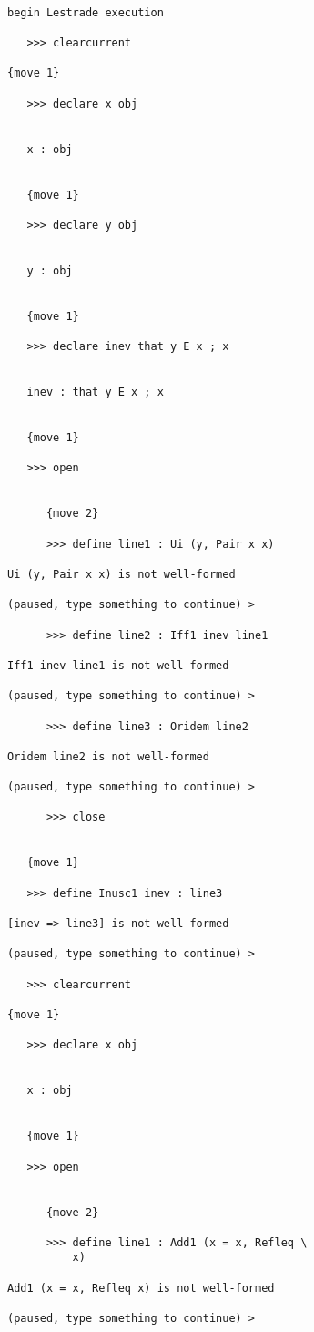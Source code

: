 \documentclass[12pt]{article}
\begin{document}
\begin{verbatim}

begin Lestrade execution

   >>> clearcurrent

{move 1}

   >>> declare x obj


   x : obj


   {move 1}

   >>> declare y obj


   y : obj


   {move 1}

   >>> declare inev that y E x ; x


   inev : that y E x ; x


   {move 1}

   >>> open


      {move 2}

      >>> define line1 : Ui (y, Pair x x)

Ui (y, Pair x x) is not well-formed

(paused, type something to continue) >

      >>> define line2 : Iff1 inev line1

Iff1 inev line1 is not well-formed

(paused, type something to continue) >

      >>> define line3 : Oridem line2

Oridem line2 is not well-formed

(paused, type something to continue) >

      >>> close


   {move 1}

   >>> define Inusc1 inev : line3

[inev => line3] is not well-formed

(paused, type something to continue) >

   >>> clearcurrent

{move 1}

   >>> declare x obj


   x : obj


   {move 1}

   >>> open


      {move 2}

      >>> define line1 : Add1 (x = x, Refleq \
          x)

Add1 (x = x, Refleq x) is not well-formed

(paused, type something to continue) >


\end{verbatim}
\end{document}
